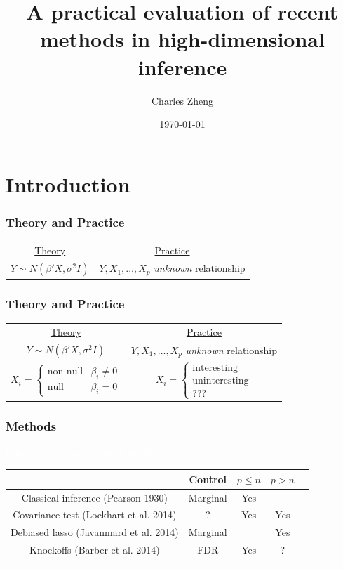 \documentclass{beamer}
\title{A practical evaluation of recent methods in high-dimensional inference}
\author{Charles Zheng} %
\institute[Stanford] %
{Stanford University}
\date{\today} %
\begin{document}
\begin{frame}
\titlepage %
\end{frame}

\section{Introduction}

\begin{frame}
\frametitle{Theory and Practice}
\begin{center}
\begin{tabular}{c|c}
\underline{Theory} & \underline{Practice}\\
$Y \sim N(\beta' X, \sigma^2 I)$ & $Y, X_1,\hdots, X_p$ \emph{unknown} relationship
\end{tabular}
\end{center}
\end{frame}

\begin{frame}
\frametitle{Theory and Practice}
\begin{center}
\begin{tabular}{c|c}
\underline{Theory} & \underline{Practice}\\
$Y \sim N(\beta' X, \sigma^2 I)$ & $Y, X_1,\hdots, X_p$ \emph{unknown} relationship\\
$X_i = \begin{cases}
\text{non-null} & \beta_i \neq 0\\ 
\text{null} & \beta_i = 0
\end{cases}$ &
$X_i = \begin{cases}
\text{interesting}\\ 
\text{uninteresting}\\
\text{???}
\end{cases}$
\end{tabular}
\end{center}
\end{frame}

\begin{frame}
\frametitle{Methods}
\textcolor{white}{But what's actually used in practice?}
\begin{center}
\begin{tabular}{c|c|c|c|c}
 & Control & $p \leq n$ &  $p > n$\\ \hline
Classical inference (Pearson 1930) & Marginal & Yes & \\ \hline
Covariance test (Lockhart et al. 2014) &  ? & Yes & Yes\\ \hline
Debiased lasso (Javanmard et al. 2014) & Marginal & & Yes\\ \hline
Knockoffs (Barber et al. 2014) & FDR & Yes & ? \\ \hline
 & & & \\ \hline
\end{tabular}
\end{center}
\end{frame}
\end{document}
